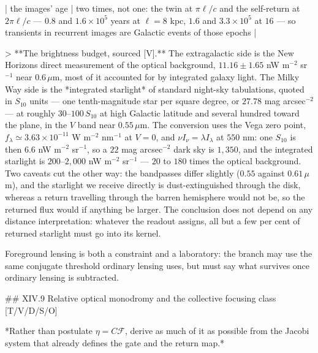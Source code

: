 | the images' age | two times, not one: the twin at $\pi\ell/c$ and the self-return at $2\pi\ell/c$ — $0.8$ and $1.6\times10^5$ years at $\ell = 8$ kpc, $1.6$ and $3.3\times10^5$ at $16$ — so transients in recurrent images are Galactic events of those epochs |

> **The brightness budget, sourced [V].** The extragalactic side is the New Horizons direct measurement of the optical background, $11.16\pm1.65$ nW m$^{-2}$ sr$^{-1}$ near $0.6\,\mu$m, most of it accounted for by integrated galaxy light. The Milky Way side is the *integrated starlight* of standard night-sky tabulations, quoted in $S_{10}$ units — one tenth-magnitude star per square degree, or $27.78$ mag arcsec$^{-2}$ — at roughly $30$–$100\,S_{10}$ at high Galactic latitude and several hundred toward the plane, in the $V$ band near $0.55\,\mu$m. The conversion uses the Vega zero point, $f_\lambda\simeq3.63\times10^{-11}$ W m$^{-2}$ nm$^{-1}$ at $V = 0$, and $\nu I_\nu = \lambda I_\lambda$ at $550$ nm: one $S_{10}$ is then $6.6$ nW m$^{-2}$ sr$^{-1}$, so a $22$ mag arcsec$^{-2}$ dark sky is $1{,}350$, and the integrated starlight is $200$–$2{,}000$ nW m$^{-2}$ sr$^{-1}$ — $20$ to $180$ times the optical background. Two caveats cut the other way: the bandpasses differ slightly ($0.55$ against $0.61\,\mu$m), and the starlight we receive directly is dust-extinguished through the disk, whereas a return travelling through the barren hemisphere would not be, so the returned flux would if anything be larger. The conclusion does not depend on any distance interpretation: whatever the readout assigns, all but a few per cent of returned starlight must go into its kernel.

Foreground lensing is both a constraint and a laboratory: the branch may use the same conjugate threshold ordinary lensing uses, but must say what survives once ordinary lensing is subtracted.

## XIV.9 Relative optical monodromy and the collective focusing class [T/V/D/S/O]

*Rather than postulate $\eta = C\mathcal F$, derive as much of it as possible from the Jacobi system that already defines the gate and the return map.*

